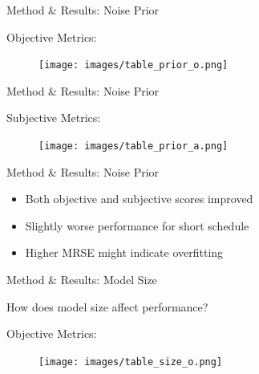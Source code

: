 \documentclass{beamer}
\begin{document}

\begin{frame}{Method \& Results: Noise Prior}

Objective Metrics:

    \begin{figure}[H]
        \centering
        \texttt{[image: images/table\_prior\_o.png]}
    \end{figure}

\end{frame}


\begin{frame}{Method \& Results: Noise Prior}

Subjective Metrics:

    \begin{figure}[H]
        \centering
        \texttt{[image: images/table\_prior\_a.png]}
    \end{figure}

\end{frame}


\begin{frame}{Method \& Results: Noise Prior}

    \begin{itemize}
        \setlength\itemsep{1.5em}
        \item Both objective and subjective scores improved
        \pause
        \item Slightly worse performance for short schedule
        \pause
        \item Higher MRSE might indicate overfitting
    \end{itemize}

\end{frame}


\begin{frame}{Method \& Results: Model Size}

    How does model size affect performance?

    \vspace{0.5cm}

    Objective Metrics:

    \begin{figure}
        \centering
        \texttt{[image: images/table\_size\_o.png]}
    \end{figure}

\end{frame}
\end{document}
